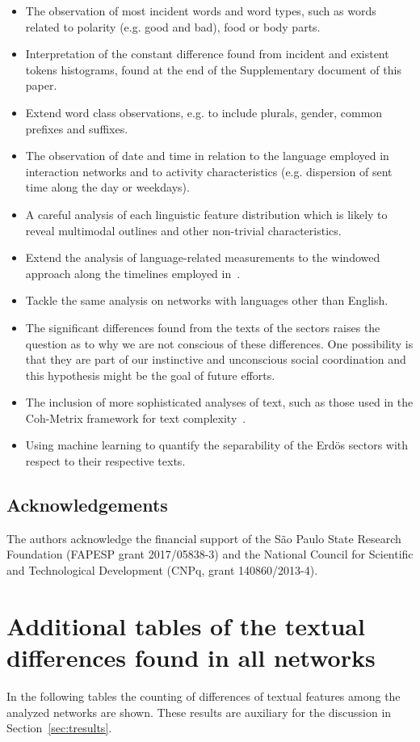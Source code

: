 \documentclass[review]{elsarticle}
\begin{document}
\begin{itemize}
\item The observation of most incident words and word types,
  such as words related to polarity (e.g. good and bad), food or body parts.
\item Interpretation of the constant difference found from incident and existent tokens histograms, found at the end of the Supplementary document of this paper.
\item Extend word class observations, e.g. to include plurals, gender, common prefixes and suffixes.
\item The observation of date and time in relation to the language employed in interaction networks and
to activity characteristics (e.g. dispersion of sent time along the day or weekdays).
\item A careful analysis of each linguistic feature distribution which is likely to reveal multimodal outlines and other non-trivial characteristics.
\item Extend the analysis of language-related measurements to the windowed approach along the timelines employed in~\cite{stab}.
\item Tackle the same analysis on networks with languages other than English.
\item The significant differences found from the texts of the sectors raises the question as to why we are not conscious of these differences.
One possibility is that they are part of our instinctive and unconscious social coordination and this hypothesis might be the goal of future efforts.
\item The inclusion of more sophisticated analyses of text, such as those used in the Coh-Metrix framework for text complexity~\cite{coh}.
\item Using machine learning to quantify the separability of the Erdös sectors with respect to their respective texts.
\end{itemize}

\subsection*{Acknowledgements}
The authors acknowledge the financial support of the São Paulo State Research Foundation (FAPESP grant 2017/05838-3) and the National Council for Scientific and Technological Development (CNPq, grant 140860/2013-4).

\appendix
\section{Additional tables of the textual differences found in all networks}\label{ap:textd}
In the following tables the counting of differences of textual features among the analyzed networks
are shown.
	These results are auxiliary for the discussion in Section~\ref{sec:tresults}.
\FloatBarrier










\end{document}
